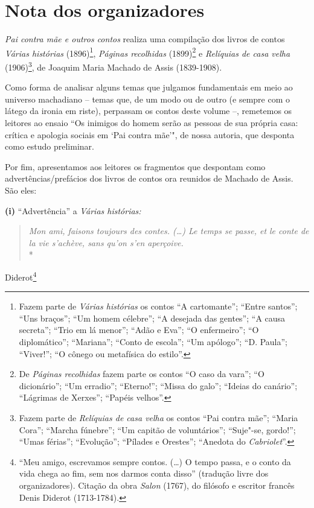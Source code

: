 
\chapter{Nota dos organizadores}

\emph{Pai contra mãe e outros contos} realiza uma compilação dos livros
de contos \emph{Várias histórias} (1896)\footnote{Fazem parte de
  \emph{Várias histórias} os contos ``A cartomante''; ``Entre santos'';
  ``Uns braços''; ``Um homem célebre''; ``A desejada das gentes''; ``A
  causa secreta''; ``Trio em lá menor''; ``Adão e Eva''; ``O
  enfermeiro''; ``O diplomático''; ``Mariana''; ``Conto de escola'';
  ``Um apólogo''; ``D. Paula''; ``Viver!''; ``O cônego ou metafísica do
  estilo''.}, \emph{Páginas recolhidas} (1899)\footnote{De \emph{Páginas
  recolhidas} fazem parte os contos ``O caso da vara''; ``O
  dicionário''; ``Um erradio''; ``Eterno!''; ``Missa do galo''; ``Ideias
  do canário''; ``Lágrimas de Xerxes''; ``Papéis velhos''.} e
\emph{Relíquias de casa velha} (1906)\footnote{Fazem parte de
  \emph{Relíquias de casa velha} os contos ``Pai contra mãe''; ``Maria
  Cora''; ``Marcha fúnebre''; ``Um capitão de voluntários''; ``Suje"-se,
  gordo!''; ``Umas férias''; ``Evolução''; ``Pílades e Orestes'';
  ``Anedota do \emph{Cabriolet}''.}, de Joaquim Maria Machado de Assis
(1839-1908).

Como forma de analisar alguns temas que julgamos fundamentais em meio ao
universo machadiano -- temas que, de um modo ou de outro (e sempre com o
látego da ironia em riste), perpassam os contos deste volume --,
remetemos os leitores ao ensaio ``Os inimigos do homem serão as pessoas
de sua própria casa: crítica e apologia sociais em `Pai contra mãe'",
de nossa autoria, que desponta como estudo preliminar.

Por fim, apresentamos aos leitores os fragmentos que despontam como
advertências/prefácios dos livros de contos ora reunidos de Machado de
Assis. São eles:

\textbf{(i)} ``Advertência'' a \emph{Várias histórias: }

\begin{quote}
\emph{Mon ami, faisons toujours des contes. (\ldots{}) Le temps se passe, et
le conte de la vie s'achève, sans qu'on s'en aperçoive. }\\*\end{quote}
\begin{flushright}Diderot\footnote{``Meu amigo, escrevamos sempre contos. (\ldots{}) O tempo%
  passa, e o conto da vida chega ao fim, sem nos darmos conta disso''
  (tradução livre dos organizadores). Citação da obra \emph{Salon}
  (1767), do filósofo e escritor francês Denis Diderot (1713-1784).}\end{flushright}

